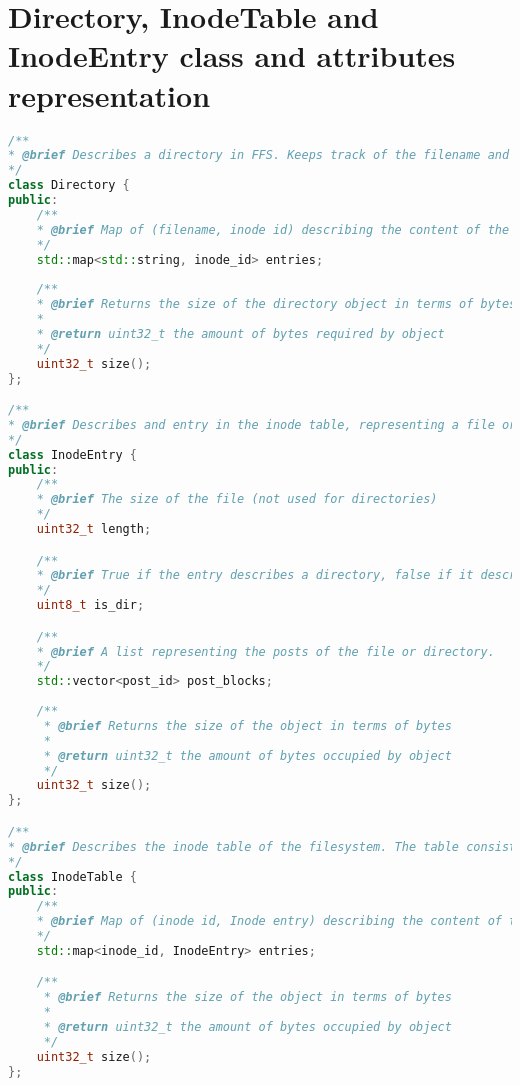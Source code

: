 \renewcommand{\chaptermark}[1]{\markboth{Appendix \thechapter\relax:\thinspace\relax#1}{}}
\chapter{Directory, InodeTable and InodeEntry class and attributes representation}
\label{app:inode_dir_code}
\begin{lstlisting}[language=c++, caption={The attributes classes representing directories and the inode table in FFS}, label=lst:dir_itable_classes,breaklines=true]
/**
* @brief Describes a directory in FFS. Keeps track of the filename and inode of each file
*/
class Directory {
public:
	/**
	* @brief Map of (filename, inode id) describing the content of the directory
	*/
	std::map<std::string, inode_id> entries;
	
	/**
	* @brief Returns the size of the directory object in terms of bytes
	* 
	* @return uint32_t the amount of bytes required by object
	*/
	uint32_t size();
};

/**
* @brief Describes and entry in the inode table, representing a file or directory
*/
class InodeEntry {
public:
	/**
	* @brief The size of the file (not used for directories) 
	*/
	uint32_t length;

	/**
	* @brief True if the entry describes a directory, false if it describes a file
	*/
	uint8_t is_dir;

	/**
	* @brief A list representing the posts of the file or directory. 
	*/
	std::vector<post_id> post_blocks;
	
	/**
	 * @brief Returns the size of the object in terms of bytes
	 * 
	 * @return uint32_t the amount of bytes occupied by object
	 */
	uint32_t size();
};

/**
* @brief Describes the inode table of the filesystem. The table consists of multiple inode entries
*/
class InodeTable {
public:
	/**
	* @brief Map of (inode id, Inode entry) describing the content of the inode table
	*/
	std::map<inode_id, InodeEntry> entries;

	/**
	 * @brief Returns the size of the object in terms of bytes
	 * 
	 * @return uint32_t the amount of bytes occupied by object
	 */
	uint32_t size();
};

\end{lstlisting}